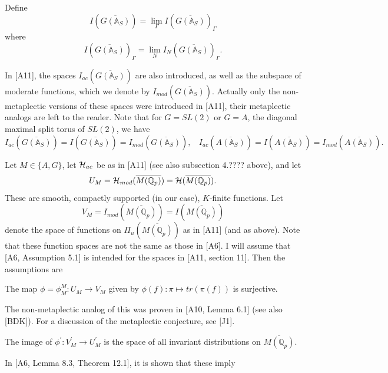 Define
\begin{equation}
I(\overline{G({\mathbb{A}}_S)})
=\lim_{\Gamma}
I(\overline{G({\mathbb{A}}_S)})_\Gamma
\end{equation}
where
\[
I(\overline{G({\mathbb{A}}_S)})_\Gamma
=\lim_N
I_N(\overline{G({\mathbb{A}}_S)})_\Gamma .
\]

In [A11], the spaces $I_{ac}(\overline{G({\mathbb{A}}_S)})$ are also
introduced, as well as the subspace of moderate functions,
which we denote by $I_{mod}(\overline{G({\mathbb{A}}_S)})$.
Actually only the non-metaplectic versions of these spaces
were introduced in [A11], their metaplectic analogs are left
to the reader.
Note that for $G=SL(2)$ or $G=A$, the diagonal maximal split torus
of $SL(2)$, we have
\[
I_{ac}(\overline{G({\mathbb{A}}_S)})=I(\overline{G({\mathbb{A}}_S)})
=I_{mod}(\overline{G({\mathbb{A}}_S)}),
\ \ \ \ 
I_{ac}(\overline{A({\mathbb{A}}_S)})
=I(\overline{A({\mathbb{A}}_S)})
=I_{mod}(\overline{A({\mathbb{A}}_S)}).
\]

Let $M\in \{A,G\}$, let ${\cal{H}}_{ac}$ be as in
[A11] (see also subsection 4.???? above),
and let 
\[
U_M={\cal{H}}_{mod}(\overline{M({\mathbb{Q}}_p)})
={\cal{H}}(\overline{M({\mathbb{Q}}_p)}) .
\]
These are smooth, compactly supported (in our case), $K$-finite
functions. Let 
\[
V_M=I_{mod}(\overline{M({\mathbb{Q}}_p)}) =I(\overline{M({\mathbb{Q}}_p)})
\]
denote the space of functions on $\Pi _u(\overline{M({\mathbb{Q}}_p)})$ as
in [A11] (and as above).
Note that these function spaces are not the same as those in [A6].
I will assume that [A6, Assumption 5.1] is intended
for the spaces in [A11, section 11].
Then the assumptions are

\begin{conjecture}
The map $\phi=\phi_M^M :U_M\rightarrow V_M$ given by
$\phi (f):\pi \longmapsto tr(\pi (f)) $ is surjective.
\end{conjecture}

The non-metaplectic analog of this
was proven in [A10, Lemma 6.1] (see also [BDK]).
For a discussion of the metaplectic conjecture, see [J1].

\begin{conjecture}
The image of $\phi ^{\prime }:V_M^{\prime }\rightarrow U_M^{\prime }$ is the
space of all invariant distributions on
$\overline{M({\mathbb {Q}}_p)}$.
\end{conjecture}

In [A6, Lemma 8.3, Theorem 12.1], it is shown that these imply

